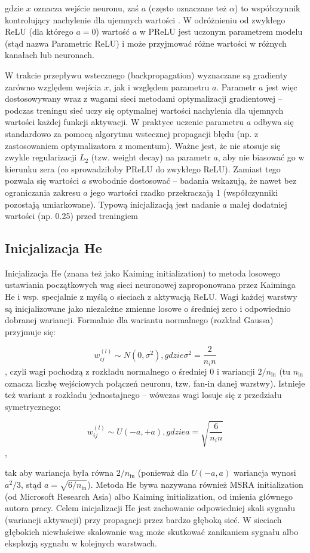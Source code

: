 gdzie $x$ oznacza wejście neuronu, zaś $a$ (często oznaczane też $\alpha$) to współczynnik kontrolujący nachylenie dla ujemnych wartości \cite{he2015}. W odróżnieniu od zwykłego ReLU (dla którego $a=0$) wartość $a$ w PReLU jest uczonym parametrem modelu (stąd nazwa Parametric ReLU) i może przyjmować różne wartości w różnych kanałach lub neuronach.

W trakcie przepływu wstecznego (backpropagation) wyznaczane są gradienty zarówno względem wejścia $x$, jak i względem parametru $a$. Parametr $a$ jest więc dostosowywany wraz z wagami sieci metodami optymalizacji gradientowej – podczas treningu sieć uczy się optymalnej wartości nachylenia dla ujemnych wartości każdej funkcji aktywacji. W praktyce uczenie parametru $a$ odbywa się standardowo za pomocą algorytmu wstecznej propagacji błędu (np. z zastosowaniem optymalizatora z momentum). Ważne jest, że nie stosuje się zwykle regularizacji $L_2$ (tzw. weight decay) na parametr $a$, aby nie biasować go w kierunku zera (co sprowadziłoby PReLU do zwykłego ReLU). Zamiast tego pozwala się wartości $a$ swobodnie dostosować – badania wskazują, że nawet bez ograniczania zakresu $a$ jego wartości rzadko przekraczają 1 (współczynniki pozostają umiarkowane). Typową inicjalizacją jest nadanie $a$ małej dodatniej wartości (np. 0.25) przed treningiem

\subsection*{Inicjalizacja He}

Inicjalizacja He (znana też jako Kaiming initialization) to metoda losowego ustawiania początkowych wag sieci neuronowej zaproponowana przez Kaiminga He i wsp. \cite{he2015} specjalnie z myślą o sieciach z aktywacją ReLU. Wagi każdej warstwy są inicjalizowane jako niezależne zmienne losowe o średniej zero i odpowiednio dobranej wariancji. Formalnie dla wariantu normalnego (rozkład Gaussa) przyjmuje się: 

\[w_{ij}^(l) \sim N(0, \sigma^2), gdzie \sigma^2=\frac{2}{n_in}\],
czyli wagi pochodzą z rozkładu normalnego o średniej 0 i wariancji $2/n_{\text{in}}$ (tu $n_{\text{in}}$ oznacza liczbę wejściowych połączeń neuronu, tzw. fan-in danej warstwy). Istnieje też wariant z rozkładu jednostajnego – wówczas wagi losuje się z przedziału symetrycznego:

\[w_{ij}^(l) \sim U(-a, +a), gdzie a=\sqrt{\frac{6}{n_in}}\],

tak aby wariancja była równa $2/n_{\text{in}}$ (ponieważ dla $U(-a,a)$ wariancja wynosi $a^2/3$, stąd $a=\sqrt{6/n_{\text{in}}}$). Metoda He bywa nazywana również MSRA initialization (od Microsoft Research Asia) albo Kaiming initialization, od imienia głównego autora pracy. Celem inicjalizacji He jest zachowanie odpowiedniej skali sygnału (wariancji aktywacji) przy propagacji przez bardzo głęboką sieć. W sieciach głębokich niewłaściwe skalowanie wag może skutkować zanikaniem sygnału albo eksplozją sygnału w kolejnych warstwach.


